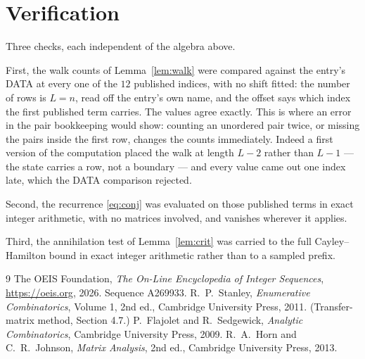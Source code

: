 \documentclass[11pt,a4paper]{article}
\theoremstyle{plain}
\theoremstyle{definition}
\begin{document}
\section{Verification}

Three checks, each independent of the algebra above.

First, the walk counts of Lemma~\ref{lem:walk} were compared against the entry's DATA at
every one of the $12$ published indices, with no shift fitted: the number of rows is
$L=n$, read off the entry's own name, and the offset says which index the first
published term carries. The values agree exactly. This is where an error in the pair
bookkeeping would show: counting an unordered pair twice, or missing the pairs inside the
first row, changes the counts immediately. Indeed a first version of the computation
placed the walk at length $L-2$ rather than $L-1$ --- the state carries a row, not a
boundary --- and every value came out one index late, which the DATA comparison rejected.

Second, the recurrence \eqref{eq:conj} was evaluated on those published terms in exact
integer arithmetic, with no matrices involved, and vanishes wherever it applies.

Third, the annihilation test of Lemma~\ref{lem:crit} was carried to the full
Cayley--Hamilton bound in exact integer arithmetic rather than to a sampled prefix.

\begin{thebibliography}{9}
 The OEIS Foundation, \emph{The On-Line Encyclopedia of Integer
Sequences}, \url{https://oeis.org}, 2026. Sequence A269933.
 R.~P.~Stanley, \emph{Enumerative Combinatorics}, Volume 1, 2nd ed.,
Cambridge University Press, 2011. (Transfer-matrix method, Section 4.7.)
 P.~Flajolet and R.~Sedgewick, \emph{Analytic Combinatorics}, Cambridge
University Press, 2009.
 R.~A.~Horn and C.~R.~Johnson, \emph{Matrix Analysis}, 2nd ed., Cambridge
University Press, 2013.
\end{thebibliography}
\end{document}
